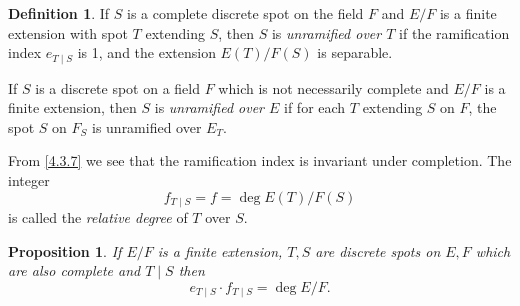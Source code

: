 \documentclass[10pt,leqno]{article}
\newtheorem{prop}[theo]{Proposition}
\theoremstyle{definition}
\newtheorem{defi}[theo]{Definition}
\begin{document}
\begin{defi}
\label{4.6.4}
If $S$ is a complete discrete spot on the field $F$ and $E/F$ is a finite extension with spot $T$ extending $S$, then $S$ is \emph{unramified over $T$} if the ramification index $e_{T \mid S}$ is 1, and the extension $E(T)/F(S)$ is separable.

If $S$ is a discrete spot on a field $F$ which is not necessarily complete and $E/F$ is a finite extension, then $S$ is \emph{unramified over $E$} if for each $T$ extending $S$ on $F$, the spot $S$ on $F_S$ is unramified over $E_T$.
\end{defi}


From \ref{4.3.7} we see that the ramification index is invariant under completion.
The integer
\begin{equation}
\label{4.6.5}
f_{T \mid S} = f = \deg E(T) / F(S)
\end{equation}
is called the \emph{relative degree} of $T$ over $S$.


\begin{prop}
\label{4.6.6}
If $E/F$ is a finite extension, $T,S$ are discrete spots on $E,F$ which are also complete and $T \mid S$ then
\[
e_{T\mid S} \cdot f_{T \mid S} = \deg E/F.
\]
\end{prop}
\end{document}
